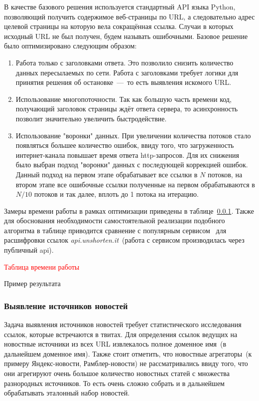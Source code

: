         В качестве базового решения используется стандартный API языка Python, позволяющий получить содержимое веб-страницы по URL,
        а следовательно адрес целевой страницы на которую вела сокращённая ссылка. Случаи в которых исходный URL не был получен, будем называть ошибочными.
        Базовое решение было оптимизировано следующим образом:
        \begin{enumerate}
            \item Работа только с заголовками ответа. Это позволило снизить количество данных пересылаемых по сети.
            Работа с заголовками требует логики для принятия решения об остановке~---~то есть выявления искомого URL.
            \item Использование многопоточности.
            Так как большую часть времени код, получающий заголовок страницы ждёт ответа сервера, то асинхронность позволит значительно увеличить быстродействие.
            \item Использование "воронки" данных. При увеличении количества потоков стало появляться большее количество ошибок,
            ввиду того, что загруженность интернет-канала повышает время ответа http-запросов.
            Для их снижения было выбран подход "воронки" данных с последующей коррекцией ошибок. Данный подход на первом этапе обрабатывает все ссылки в $N$ потоков,
            на втором этапе все ошибочные ссылки полученные на первом обрабатываются в $N/10$ потоков и так далее, вплоть до 1 потока на итерацию.
        \end{enumerate}
        Замеры времени работы в рамках оптимизации приведены в таблице~\ref{}.
        Также для обоснования необходимости самостоятельной реализации подобного алгоритма в таблице приводится сравнение с популярным сервисом \
        для расшифровки ссылок \textit{api.unshorten.it}~(работа с сервисом производилась через публичный api).

        \textcolor{red}{Таблица времени работы}

        Пример результата

    \subsubsection{Выявление источников новостей}
        Задача выявления источников новостей требует статистического исследования ссылок, которые встречаются в твитах.
        Для определения ссылок ведущих на новостные источники из всех URL извлекалось полное доменное имя~(в дальнейшем доменное имя).
        Также стоит отметить, что новостные агрегаторы~(к примеру Яндекс-новости, Рамблер-новости) не рассматривались ввиду того, что они агрегируют
        очень большое количество новостных статей с множества разнородных источников. То есть очень сложно собрать и в дальнейшем обрабатывать эталонный набор новостей.

